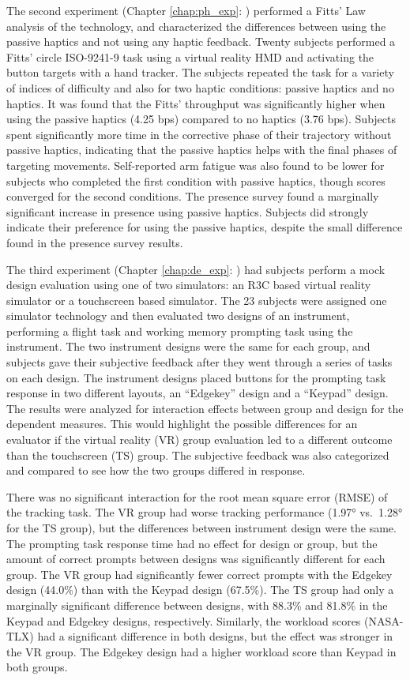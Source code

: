 The second experiment (Chapter \ref{chap:ph_exp}: ) performed a Fitts' Law analysis of the technology, and characterized the differences between using the passive haptics and not using any haptic feedback.
Twenty subjects performed a Fitts' circle ISO-9241-9 task using a virtual reality HMD and activating the button targets with a hand tracker.
The subjects repeated the task for a variety of indices of difficulty and also for two haptic conditions: passive haptics and no haptics.
It was found that the Fitts' throughput was significantly higher when using the passive haptics (4.25 bps) compared to no haptics (3.76 bps).
Subjects spent significantly more time in the corrective phase of their trajectory without passive haptics, indicating that the passive haptics helps with the final phases of targeting movements.
Self-reported arm fatigue was also found to be lower for subjects who completed the first condition with passive haptics, though scores converged for the second conditions.
The presence survey found a marginally significant increase in presence using passive haptics.
Subjects did strongly indicate their preference for using the passive haptics, despite the small difference found in the presence survey results.

The third experiment (Chapter \ref{chap:de_exp}: ) had subjects perform a mock design evaluation using one of two simulators: an R3C based virtual reality simulator or a touchscreen based simulator.
The 23 subjects were assigned one simulator technology and then evaluated two designs of an instrument, performing a flight task and working memory prompting task using the instrument.
The two instrument designs were the same for each group, and subjects gave their subjective feedback after they went through a series of tasks on each design.
The instrument designs placed buttons for the prompting task response in two different layouts, an ``Edgekey'' design and a ``Keypad'' design.
The results were analyzed for interaction effects between group and design for the dependent measures.
This would highlight the possible differences for an evaluator if the virtual reality (VR) group evaluation led to a different outcome than the touchscreen (TS) group.
The subjective feedback was also categorized and compared to see how the two groups differed in response.

There was no significant interaction for the root mean square error (RMSE) of the tracking task.
The VR group had worse tracking performance (\ang{1.97} vs.\ \ang{1.28} for the TS group), but the differences between instrument design were the same.
The prompting task response time had no effect for design or group, but the amount of correct prompts between designs was significantly different for each group.
The VR group had significantly fewer correct prompts with the Edgekey design (44.0\%) than with the Keypad design (67.5\%).
The TS group had only a marginally significant difference between designs, with 88.3\% and 81.8\% in the Keypad and Edgekey designs, respectively.
Similarly, the workload scores (NASA-TLX) had a significant difference in both designs, but the effect was stronger in the VR group.
The Edgekey design had a higher workload score than Keypad in both groups.

